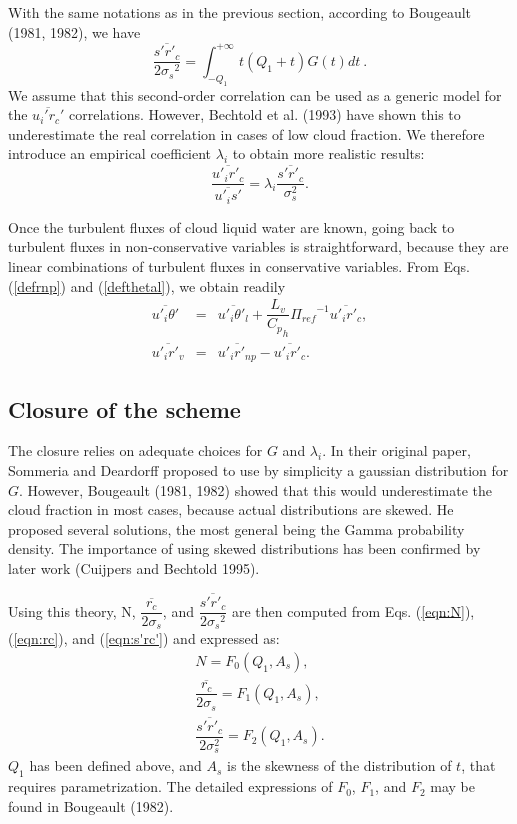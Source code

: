 With the same notations as in the previous section, according to
Bougeault (1981, 1982), we have
\begin{equation}\label{eqn:s'rc'}
\dfrac{\overline{{s'}{r'_{c}}}}{2{{\sigma}_{s}}^2} =
\int_{-Q_{1}}^{+\infty} t(Q_{1}+t)G(t) dt~.
\end{equation}
We assume that this second-order correlation can be used as a generic model
for the $\overline{u_i' r_c'}$ correlations. However, Bechtold et al. (1993)
have shown this to underestimate the real correlation in cases of low cloud
fraction. We therefore introduce an empirical coefficient $\lambda_i$ to
obtain more realistic results:
\begin{equation}\label{eqn:key}
\dfrac{\overline{u'_i r'_c}}{\overline{u'_i s'}} =
\lambda_i \dfrac{\overline{s' r'_c}}{\sigma_s^2}.
\end{equation}

\smallskip
Once the turbulent fluxes of cloud liquid water are known,
 going back to turbulent
fluxes in non-conservative variables is straightforward, because they are
linear combinations of turbulent fluxes in conservative variables.  From
Eqs. (\ref{defrnp}) and (\ref{defthetal}), we obtain readily
\begin{eqnarray}
\overline{{u'_{i}}{{\theta}'}} &=&\overline{{u'_{i}}{{\theta}'_{l}}}  +
\dfrac{L_{v}}{{C_{p}}_{h}}{{\Pi}_{ref}}^{-1} \overline{{u'_{i}}{r'_{c}}}, \\
\overline{{u'_{i}}{r'_{v}}}&=&\overline{{u'_{i}}{r'_{np}}}  -
\overline{{u'_{i}}{r'_{c}}}.
\end{eqnarray}

\subsection{Closure of the scheme}

The closure relies on adequate choices for $G$ and $\lambda_i$.
In their original paper, Sommeria and Deardorff proposed to use by simplicity
a gaussian distribution for $G$. However, Bougeault (1981, 1982) showed
that this would underestimate the cloud fraction in most cases, because
actual distributions are skewed. He proposed several solutions, the
most general being the Gamma probability density. The importance of using
skewed distributions has been confirmed by later work (Cuijpers and
Bechtold 1995).


Using this theory, N, $\dfrac{\overline{r_{c}}}{2{\sigma}_{s}}$, and
$\dfrac{\overline{{s'}{r'_{c}}}}{2{{\sigma}_{s}}^2}$ are then computed from
Eqs. (\ref{eqn:N}), (\ref{eqn:rc}), and (\ref{eqn:s'rc'}) and expressed as:
\begin{eqnarray}
\label{eqn:NF0} N = F_0(Q_1,A_s), \\
\label{eqn:rcF1} \dfrac{\overline{r_c}}{2\sigma_s}=F_1(Q_1,A_s),\\
\label{eqn:s'rc'F2} \dfrac{\overline{s'r'_c}}{2\sigma_s^2}=F_2(Q_1,A_s).
\end{eqnarray}
$Q_1$ has been defined above, and $A_s$ is the skewness of the distribution
of $t$, that requires parametrization.
The detailed expressions of $F_0$, $F_1$, and $F_2$ may be found in Bougeault
(1982).

